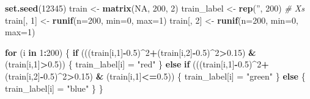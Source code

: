 \documentclass[]{article}
\newenvironment{Shaded}{\begin{snugshade}}{\end{snugshade}}
\newcommand{\CommentTok}[1]{\textcolor[rgb]{0.56,0.35,0.01}{\textit{#1}}}
\newcommand{\ControlFlowTok}[1]{\textcolor[rgb]{0.13,0.29,0.53}{\textbf{#1}}}
\newcommand{\DataTypeTok}[1]{\textcolor[rgb]{0.13,0.29,0.53}{#1}}
\newcommand{\DecValTok}[1]{\textcolor[rgb]{0.00,0.00,0.81}{#1}}
\newcommand{\FloatTok}[1]{\textcolor[rgb]{0.00,0.00,0.81}{#1}}
\newcommand{\KeywordTok}[1]{\textcolor[rgb]{0.13,0.29,0.53}{\textbf{#1}}}
\newcommand{\NormalTok}[1]{#1}
\newcommand{\OperatorTok}[1]{\textcolor[rgb]{0.81,0.36,0.00}{\textbf{#1}}}
\newcommand{\OtherTok}[1]{\textcolor[rgb]{0.56,0.35,0.01}{#1}}
\newcommand{\StringTok}[1]{\textcolor[rgb]{0.31,0.60,0.02}{#1}}
\begin{document}
\begin{Shaded}
\begin{Highlighting}[]
\KeywordTok{set.seed}\NormalTok{(}\DecValTok{12345}\NormalTok{)}
\NormalTok{train <-}\StringTok{ }\KeywordTok{matrix}\NormalTok{(}\OtherTok{NA}\NormalTok{, }\DecValTok{200}\NormalTok{, }\DecValTok{2}\NormalTok{)}
\NormalTok{train_label <-}\StringTok{ }\KeywordTok{rep}\NormalTok{(}\StringTok{''}\NormalTok{, }\DecValTok{200}\NormalTok{)}
\CommentTok{# Xs}
\NormalTok{train[, }\DecValTok{1}\NormalTok{] <-}\StringTok{ }\KeywordTok{runif}\NormalTok{(}\DataTypeTok{n=}\DecValTok{200}\NormalTok{, }\DataTypeTok{min=}\DecValTok{0}\NormalTok{, }\DataTypeTok{max=}\DecValTok{1}\NormalTok{)}
\NormalTok{train[, }\DecValTok{2}\NormalTok{] <-}\StringTok{ }\KeywordTok{runif}\NormalTok{(}\DataTypeTok{n=}\DecValTok{200}\NormalTok{, }\DataTypeTok{min=}\DecValTok{0}\NormalTok{, }\DataTypeTok{max=}\DecValTok{1}\NormalTok{)}

\ControlFlowTok{for}\NormalTok{ (i }\ControlFlowTok{in} \DecValTok{1}\OperatorTok{:}\DecValTok{200}\NormalTok{) \{}
  \ControlFlowTok{if}\NormalTok{ (((train[i,}\DecValTok{1}\NormalTok{]}\OperatorTok{-}\FloatTok{0.5}\NormalTok{)}\OperatorTok{^}\DecValTok{2}\OperatorTok{+}\NormalTok{(train[i,}\DecValTok{2}\NormalTok{]}\OperatorTok{-}\FloatTok{0.5}\NormalTok{)}\OperatorTok{^}\DecValTok{2}\OperatorTok{>}\FloatTok{0.15}\NormalTok{) }\OperatorTok{&}\StringTok{ }\NormalTok{(train[i,}\DecValTok{1}\NormalTok{]}\OperatorTok{>}\FloatTok{0.5}\NormalTok{)) \{}
\NormalTok{    train_label[i] =}\StringTok{ "red"}
\NormalTok{  \} }\ControlFlowTok{else} \ControlFlowTok{if}\NormalTok{ (((train[i,}\DecValTok{1}\NormalTok{]}\OperatorTok{-}\FloatTok{0.5}\NormalTok{)}\OperatorTok{^}\DecValTok{2}\OperatorTok{+}\NormalTok{(train[i,}\DecValTok{2}\NormalTok{]}\OperatorTok{-}\FloatTok{0.5}\NormalTok{)}\OperatorTok{^}\DecValTok{2}\OperatorTok{>}\FloatTok{0.15}\NormalTok{) }\OperatorTok{&}\StringTok{ }\NormalTok{(train[i,}\DecValTok{1}\NormalTok{]}\OperatorTok{<=}\FloatTok{0.5}\NormalTok{)) \{}
\NormalTok{    train_label[i] =}\StringTok{ "green"}
\NormalTok{  \} }\ControlFlowTok{else}\NormalTok{ \{}
\NormalTok{    train_label[i] =}\StringTok{ "blue"}
\NormalTok{  \}}
\NormalTok{\}}


\end{Highlighting}
\end{Shaded}
\end{document}
